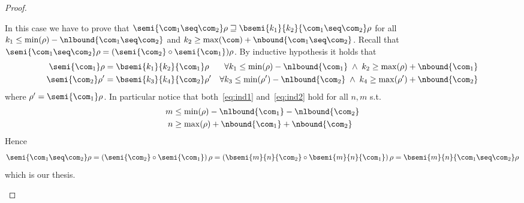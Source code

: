\begin{proof}
\begin{inductive}
     In this case we have to prove that
    \(\semi{\com_1 \seq \com_2}\rho \sqsupseteq
    \bsemi{k_1}{k_2}{\com_1 \seq \com_2}\rho\) for all
    \({k_1 \leq \min(\rho) - \nlbound{\com_1 \seq \com_2}}\) and
    \({k_2 \geq \max(\com) + \nbound{\com_1 \seq \com_2}}\). Recall
    that
    \(\semi{\com_1\seq\com_2}\rho = {\left(\semi{\com_2}
        \circ \semi{\com_1}\right)}\rho\). By inductive
    hypothesis it holds that
    \begin{align}
      \semi{\com_1}\rho & = \bsemi{k_1}{k_2}{\com_1}\rho & \forall k_1 \leq \min(\rho) - \nlbound{\com_1} \; \land \; k_2 \geq \max(\rho) + \nbound{\com_1}\label{eq:ind1}\\
      \semi{\com_2}\rho' & = \bsemi{k_3}{k_4}{\com_2}\rho' & \forall k_3 \leq \min(\rho') - \nlbound{\com_2} \; \land \; k_4 \geq \max(\rho') + \nbound{\com_2}\label{eq:ind2}
    \end{align}
    where \(\rho' = \semi{\com_1}\rho\). In particular notice
    that both\ \eqref{eq:ind1} and\ \eqref{eq:ind2} hold for all
    \(n,m\) s.t.
    \begin{align*}
      m & \leq \min(\rho) - \nlbound{\com_1} - \nlbound{\com_2} \\
      n & \geq \max(\rho) + \nbound{\com_1} + \nbound{\com_2}
    \end{align*}
    Hence
    \begin{equation*}
      \semi{\com_1 \seq \com_2}\rho =
      \left( \semi{\com_2} \circ \semi{\com_1}\right)\rho =
      \left(\bsemi{m}{n}{\com_2} \circ \bsemi{m}{n}{\com_1}\right)\rho =
      \bsemi{m}{n}{\com_1 \seq \com_2}\rho
    \end{equation*}
    which is our thesis.


\end{inductive}
\end{proof}
